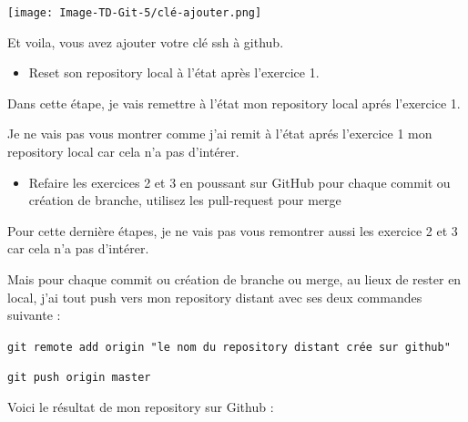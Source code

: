 \documentclass[12pt]{article}
\begin{document}
\vspace{0.3cm}

\begin{center}
  \texttt{[image: Image-TD-Git-5/clé-ajouter.png]}
\end{center}

\vspace{0.3cm}

Et voila, vous avez ajouter votre clé ssh à github.

\vspace{0.3cm}

\begin{itemize}
  \item Reset son repository local à l'état après l'exercice 1.
\end{itemize}

\vspace{0.3cm}

Dans cette étape, je vais remettre à l'état mon repository local aprés l'exercice 1. 

Je ne vais pas vous montrer comme j'ai remit à l'état aprés l'exercice 1 mon repository local car cela n'a pas d'intérer.

\vspace{0.3cm}

\begin{itemize}
  \item Refaire les exercices 2 et 3 en poussant sur GitHub pour chaque commit ou création de branche, utilisez les pull-request pour merge
\end{itemize}

\vspace{0.3cm}

Pour cette dernière étapes, je ne vais pas vous remontrer aussi les exercice 2 et 3 car cela n'a pas d'intérer. \newline

Mais pour chaque commit ou création de branche ou merge, au lieux de rester en local, j'ai tout push vers mon repository distant avec ses deux commandes suivante :

\texttt{git remote add origin "le nom du repository distant crée sur github"}

\texttt{git push origin master}

\vspace{0.3cm}

Voici le résultat de mon repository sur Github : 

\vspace{0.3cm}
\end{document}
